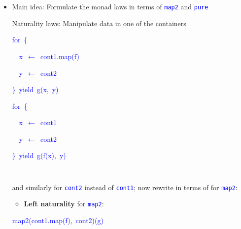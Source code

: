 \begin{itemize}
\item Main idea: Formulate the monad laws in terms of \texttt{\textcolor{blue}{\footnotesize{}map2}}
and \texttt{\textcolor{blue}{\footnotesize{}pure}} 

Naturality laws: Manipulate data in one of the containers\texttt{\textcolor{blue}{\footnotesize{}\smallskip{}
}}{\footnotesize\par}

\texttt{\textcolor{blue}{\footnotesize{}}}%
\begin{minipage}[c][1\totalheight][t]{0.49\columnwidth}%
\begin{lyxcode}
\textcolor{blue}{\footnotesize{}for~\{}{\footnotesize\par}

\textcolor{blue}{\footnotesize{}~~x~$\leftarrow$~cont1.map(f)}{\footnotesize\par}

\textcolor{blue}{\footnotesize{}~~y~$\leftarrow$~cont2}{\footnotesize\par}

\textcolor{blue}{\footnotesize{}\}~yield~g(x,~y)}{\footnotesize\par}
\end{lyxcode}
%
\end{minipage}\texttt{\textcolor{blue}{\footnotesize{}\hfill{}}}%
\begin{minipage}[c][1\totalheight][t]{0.49\columnwidth}%
\begin{lyxcode}
\textcolor{blue}{\footnotesize{}for~\{}{\footnotesize\par}

\textcolor{blue}{\footnotesize{}~~x~$\leftarrow$~cont1}{\footnotesize\par}

\textcolor{blue}{\footnotesize{}~~y~$\leftarrow$~cont2}{\footnotesize\par}

\textcolor{blue}{\footnotesize{}\}~yield~g(f(x),~y)}{\footnotesize\par}
\end{lyxcode}
%
\end{minipage}\texttt{\textcolor{blue}{\footnotesize{}\hfill{}\medskip{}
}}{\footnotesize\par}

and similarly for \texttt{\textcolor{blue}{\footnotesize{}cont2}}
instead of \texttt{\textcolor{blue}{\footnotesize{}cont1}}; now rewrite
in terms of for \texttt{\textcolor{blue}{\footnotesize{}map2}}:
\begin{itemize}
\item \textbf{Left naturality} for \texttt{\textcolor{blue}{\footnotesize{}map2}}:
\end{itemize}
\begin{lyxcode}
\textcolor{blue}{\footnotesize{}map2(cont1.map(f),~cont2)(g)}{\footnotesize\par}


\end{lyxcode}
\end{itemize}
